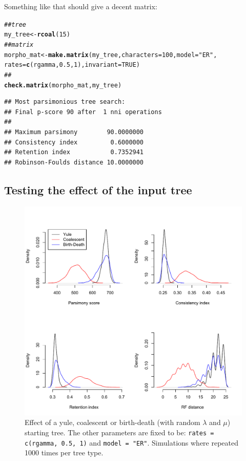\documentclass{article}\usepackage[]{graphicx}\usepackage[]{color}
\makeatletter
\newcommand{\hlnum}[1]{\textcolor[rgb]{0.686,0.059,0.569}{#1}}%
\newcommand{\hlstr}[1]{\textcolor[rgb]{0.192,0.494,0.8}{#1}}%
\newcommand{\hlcom}[1]{\textcolor[rgb]{0.678,0.584,0.686}{\textit{#1}}}%
\newcommand{\hlstd}[1]{\textcolor[rgb]{0.345,0.345,0.345}{#1}}%
\newcommand{\hlkwb}[1]{\textcolor[rgb]{0.69,0.353,0.396}{#1}}%
\newcommand{\hlkwc}[1]{\textcolor[rgb]{0.333,0.667,0.333}{#1}}%
\newcommand{\hlkwd}[1]{\textcolor[rgb]{0.737,0.353,0.396}{\textbf{#1}}}%
\newenvironment{kframe}{%
 \def\at@end@of@kframe{}%
 \ifinner\ifhmode%
  \def\at@end@of@kframe{\end{minipage}}%
  \begin{minipage}{\columnwidth}%
 \fi\fi%
 \def\FrameCommand##1{\hskip\@totalleftmargin \hskip-\fboxsep
 \colorbox{shadecolor}{##1}\hskip-\fboxsep
     \hskip-\linewidth \hskip-\@totalleftmargin \hskip\columnwidth}%
 \MakeFramed {\advance\hsize-\width
   \@totalleftmargin\z@ \linewidth\hsize
   \@setminipage}}%
 {\par\unskip\endMakeFramed%
 \at@end@of@kframe}
\newenvironment{knitrout}{}{} %
\makeatother
\begin{document}
Something like that should give a decent matrix:
\begin{knitrout}
\color{fgcolor}\begin{kframe}
\begin{alltt}
\hlcom{## tree}
\hlstd{my_tree} \hlkwb{<-} \hlkwd{rcoal}\hlstd{(}\hlnum{15}\hlstd{)}
\hlcom{## matrix}
\hlstd{morpho_mat} \hlkwb{<-} \hlkwd{make.matrix}\hlstd{(my_tree,} \hlkwc{characters} \hlstd{=} \hlnum{100}\hlstd{,} \hlkwc{model} \hlstd{=} \hlstr{"ER"}\hlstd{,}
    \hlkwc{rates} \hlstd{=} \hlkwd{c}\hlstd{(rgamma,} \hlnum{0.5}\hlstd{,} \hlnum{1}\hlstd{),} \hlkwc{invariant} \hlstd{=} \hlnum{TRUE}\hlstd{)}
\hlcom{## }
\hlkwd{check.matrix}\hlstd{(morpho_mat, my_tree)}
\end{alltt}
\begin{verbatim}
## Most parsimonious tree search:
## Final p-score 90 after  1 nni operations
##                                    
## Maximum parsimony        90.0000000
## Consistency index         0.6000000
## Retention index           0.7352941
## Robinson-Foulds distance 10.0000000
\end{verbatim}
\end{kframe}
\end{knitrout}

\newpage
\subsection{Testing the effect of the input tree}

\begin{figure}[!htbp]
\centering
   \includegraphics[width=1\textwidth]{Tree_effect.pdf}
\caption{Effect of a yule, coalescent or birth-death (with random $\lambda$ and $\mu$) starting tree.
The other parameters are fixed to be: \texttt{rates = c(rgamma, 0.5, 1)} and \texttt{model = "ER"}.
Simulations where repeated 1000 times per tree type.}
\label{Tree_effect}
\end{figure}
\end{document}
